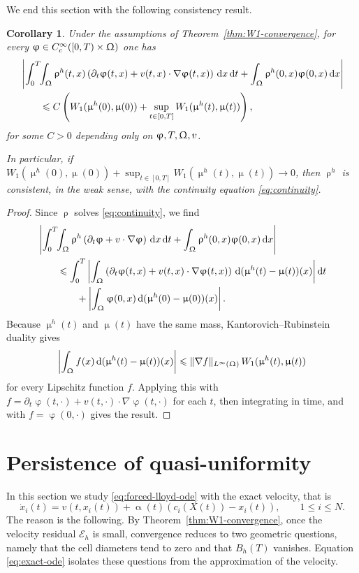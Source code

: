 \documentclass[letterpaper,11pt,twoside]{article}
\numberwithin{figure}{section}
\numberwithin{table}{section}
\theoremstyle{cpamplain}
\newtheorem{corollary}[theorem]{Corollary}
\theoremstyle{cpamdefinition}
\newcommand{\diff}{\mathrm{d}}
\let\alpha\upalpha
\let\mu\upmu
\let\rho\uprho
\let\varphi\upvarphi
\let\Omega\Upomega
\renewcommand{\le}{\leqslant}
\numberwithin{equation}{section}
\begin{document}
We end this section with the following consistency result.

\begin{corollary}\label{cor:weak-consistency}
Under the assumptions of Theorem~\ref{thm:W1-convergence}, for every
$\varphi\in C_c^\infty([0,T)\times\Omega)$ one has
\begin{align*}
&\left|
\int_0^T\!\!\int_\Omega \rho^h(t,x)\left(\partial_t\varphi(t,x)
+v(t,x)\cdot\nabla\varphi(t,x)\right)\,\diff x\,\diff t
+\int_\Omega \rho^h(0,x)\varphi(0,x)\,\diff x
\right|\\
&\qquad\le C\left(
W_1(\mu^h(0),\mu(0)) + \sup_{t\in[0,T]}W_1(\mu^h(t),\mu(t))
\right),
\end{align*}
for some $C>0$ depending only on $\varphi, T, \Omega, v$.

In particular, if $W_1(\mu^h(0),\mu(0))+\sup_{t\in[0,T]}W_1(\mu^h(t),\mu(t))\to 0$, then $\rho^h$ is consistent, in the weak sense, with the continuity equation \eqref{eq:continuity}.
\end{corollary}

\begin{proof}
Since $\rho$ solves \eqref{eq:continuity}, we find
\begin{align*}
&\left|
\int_0^T\!\!\int_\Omega \rho^h\left(\partial_t\varphi+v\cdot\nabla\varphi\right)\,\diff x\,\diff t
+\int_\Omega \rho^h(0,x)\varphi(0,x)\,\diff x
\right|\\
&\qquad\le
\int_0^T\left|
\int_\Omega \left(\partial_t\varphi(t,x)+v(t,x)\cdot\nabla\varphi(t,x)\right)\,
\diff(\mu^h(t)-\mu(t))(x)
\right|\diff t\\
&\qquad\qquad+
\left|
\int_\Omega \varphi(0,x)\,\diff(\mu^h(0)-\mu(0))(x)
\right|.
\end{align*}
Because $\mu^h(t)$ and $\mu(t)$ have the same mass, Kantorovich--Rubinstein duality gives
\[
\left|\int_\Omega f(x)\,\diff(\mu^h(t)-\mu(t))(x)\right|
\le \|\nabla f\|_{L^\infty(\Omega)}\,W_1(\mu^h(t),\mu(t))
\]
for every Lipschitz function $f$.
Applying this with $f=\partial_t\varphi(t,\cdot)+v(t,\cdot)\cdot\nabla\varphi(t,\cdot)$ for each $t$, then integrating in time, and with
$f=\varphi(0,\cdot)$ gives the result.
\end{proof}

\section{Persistence of quasi-uniformity}\label{sec:quasi-uniformity}

In this section we study \eqref{eq:forced-lloyd-ode} with the exact velocity, that is
\begin{equation}\label{eq:exact-ode}
\dot x_i(t)=v(t,x_i(t))+\alpha(t)\left(c_i(X(t))-x_i(t)\right),
\qquad 1\le i\le N .
\end{equation}
The reason is the following.
By Theorem~\ref{thm:W1-convergence}, once the velocity residual $\mathscr E_h$ is small, convergence reduces to two geometric questions, namely that the cell diameters tend to zero and that $B_h(T)$ vanishes.
Equation \eqref{eq:exact-ode} isolates these questions from the approximation of the velocity.
\end{document}
